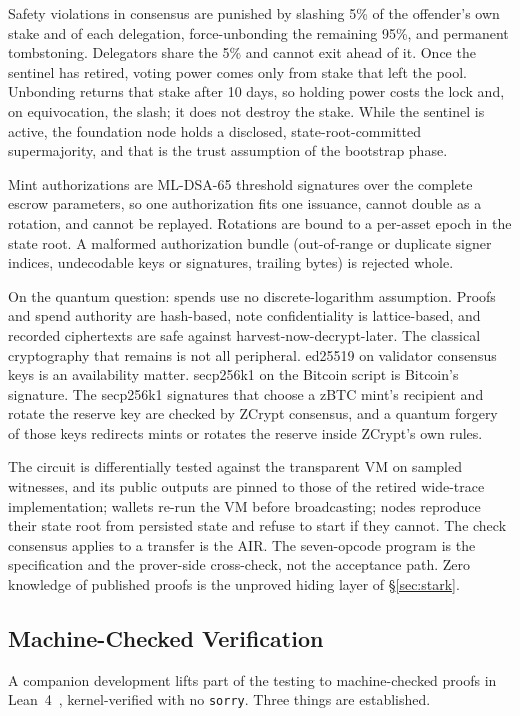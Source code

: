 \documentclass[twocolumn,10pt]{article}
\begin{document}
Safety violations in consensus are punished by slashing 5\% of the offender's own stake and of each delegation, force-unbonding the remaining 95\%, and permanent tombstoning. Delegators share the 5\% and cannot exit ahead of it. Once the sentinel has retired, voting power comes only from stake that left the pool. Unbonding returns that stake after 10 days, so holding power costs the lock and, on equivocation, the slash; it does not destroy the stake. While the sentinel is active, the foundation node holds a disclosed, state-root-committed supermajority, and that is the trust assumption of the bootstrap phase.

Mint authorizations are ML-DSA-65 threshold signatures over the complete escrow parameters, so one authorization fits one issuance, cannot double as a rotation, and cannot be replayed. Rotations are bound to a per-asset epoch in the state root. A malformed authorization bundle (out-of-range or duplicate signer indices, undecodable keys or signatures, trailing bytes) is rejected whole.

On the quantum question: spends use no discrete-logarithm assumption. Proofs and spend authority are hash-based, note confidentiality is lattice-based, and recorded ciphertexts are safe against harvest-now-decrypt-later. The classical cryptography that remains is not all peripheral. ed25519 on validator consensus keys is an availability matter. secp256k1 on the Bitcoin script is Bitcoin's signature. The secp256k1 signatures that choose a zBTC mint's recipient and rotate the reserve key are checked by ZCrypt consensus, and a quantum forgery of those keys redirects mints or rotates the reserve inside ZCrypt's own rules.

The circuit is differentially tested against the transparent VM on sampled witnesses, and its public outputs are pinned to those of the retired wide-trace implementation; wallets re-run the VM before broadcasting; nodes reproduce their state root from persisted state and refuse to start if they cannot. The check consensus applies to a transfer is the AIR. The seven-opcode program is the specification and the prover-side cross-check, not the acceptance path. Zero knowledge of published proofs is the unproved hiding layer of \S\ref{sec:stark}.

\subsection{Machine-Checked Verification}

A companion development lifts part of the testing to machine-checked proofs in Lean~4~\cite{lean4}, kernel-verified with no \texttt{sorry}. Three things are established.
\end{document}

